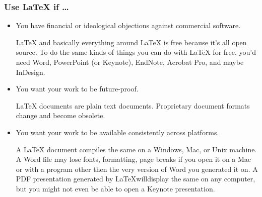 \begin{frame}
\frametitle{Use \LaTeX{} if \dots}

\begin{itemize}
\item You have financial or ideological objections against commercial
  software.

\begin{articleonly}
\LaTeX{} and basically everything around \LaTeX{} is free because it's
all open source. To do the same kinds of things you can do with
\LaTeX{} for free, you'd need Word, PowerPoint (or Keynote), EndNote,
Acrobat Pro, and maybe InDesign.
\end{articleonly}

\item You want your work to be future-proof.

\begin{articleonly}
\LaTeX{} documents are plain text documents. Proprietary document
formats change and become obsolete.
\end{articleonly}

\item You want your work to be available consistently across platforms.

\begin{articleonly}
A \LaTeX{} document compiles the same on a Windows, Mac, or Unix
machine.  A Word file may lose fonts, formatting, page breaks if you
open it on a Mac or with a program other then the very version of Word
you generated it on.  A PDF presentation generated by
\LaTeX{}willdisplay the same on any computer, but you might not even
be able to open a Keynote presentation.
\end{articleonly}
\end{itemize}

\end{frame}

